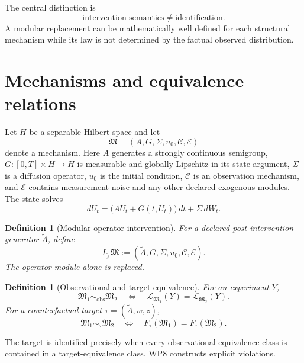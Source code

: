 \documentclass[11pt]{article}
\newtheorem{definition}[assumption]{Definition}
\theoremstyle{remark}
\newcommand{\cC}{\mathcal C}
\newcommand{\cM}{\mathfrak M}
\newcommand{\Law}{\mathcal L}
\newcommand{\obs}{\mathrm{obs}}
\begin{document}
The central distinction is
\[
 \text{intervention semantics}
 \neq
 \text{identification}.
\]
A modular replacement can be mathematically well defined for each structural mechanism while its law is not determined by the factual observed distribution.

\section{Mechanisms and equivalence relations}

Let $H$ be a separable Hilbert space and let
\[
 \cM=(A,G,\Sigma,u_0,\cC,\mathcal E)
\]
denote a mechanism. Here $A$ generates a strongly continuous semigroup, $G:[0,T]\times H\to H$ is measurable and globally Lipschitz in its state argument, $\Sigma$ is a diffusion operator, $u_0$ is the initial condition, $\cC$ is an observation mechanism, and $\mathcal E$ contains measurement noise and any other declared exogenous modules. The state solves
\begin{equation}\label{eq:general}
 dU_t
 =
 \bigl(AU_t+G(t,U_t)\bigr)\,dt
 +
 \Sigma\,dW_t.
\end{equation}

\begin{definition}[Modular operator intervention]
For a declared post-intervention generator $\widetilde A$, define
\[
 I_{\widetilde A}\cM
 :=
 (\widetilde A,G,\Sigma,u_0,\cC,\mathcal E).
\]
The operator module alone is replaced.
\end{definition}

\begin{definition}[Observational and target equivalence]
For an experiment $Y$,
\[
 \cM_1\sim_{\obs}\cM_2
 \quad\Longleftrightarrow\quad
 \Law_{\cM_1}(Y)=\Law_{\cM_2}(Y).
\]
For a counterfactual target $\tau=(\widetilde A,w,z)$,
\[
 \cM_1\sim_\tau\cM_2
 \quad\Longleftrightarrow\quad
 F_\tau(\cM_1)=F_\tau(\cM_2).
\]
\end{definition}

The target is identified precisely when every observational-equivalence class is contained in a target-equivalence class. WP8 constructs explicit violations.
\end{document}
